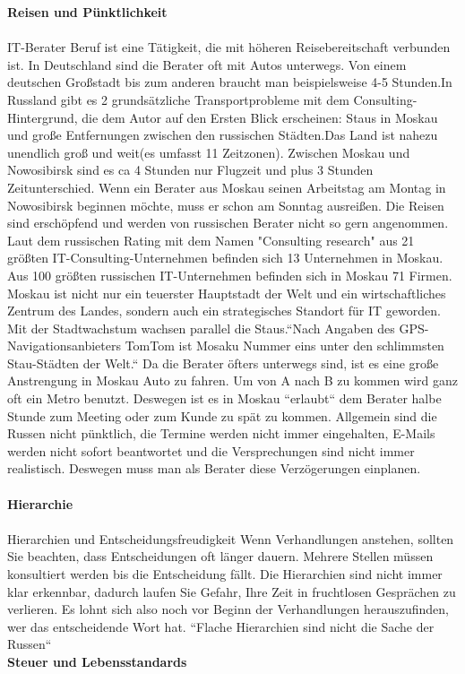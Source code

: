 	 \textbf{Reisen und Pünktlichkeit}\\
	 \\
	 IT-Berater Beruf ist eine Tätigkeit, die mit höheren Reisebereitschaft verbunden ist. In Deutschland sind die Berater oft mit Autos unterwegs. Von einem deutschen Großstadt bis zum anderen braucht man beispielsweise 4-5 Stunden.In Russland gibt es 2 grundsätzliche Transportprobleme mit dem Consulting-Hintergrund, die dem Autor auf den Ersten Blick erscheinen: Staus in Moskau und große Entfernungen zwischen den russischen Städten.Das Land ist nahezu unendlich groß und weit(es umfasst 11 Zeitzonen).
	 Zwischen Moskau und Nowosibirsk sind es ca 4 Stunden nur Flugzeit und plus 3 Stunden Zeitunterschied. Wenn ein Berater aus Moskau seinen Arbeitstag am Montag in Nowosibirsk beginnen möchte, muss er schon am Sonntag ausreißen. Die Reisen sind erschöpfend und werden von russischen Berater nicht so gern angenommen.\\
	 Laut dem russischen Rating mit dem Namen "Consulting research" aus 21 größten IT-Consulting-Unternehmen befinden sich 13 Unternehmen in Moskau.%
	 Aus 100 größten russischen IT-Unternehmen befinden sich in Moskau 71 Firmen. 
	 Moskau ist nicht nur ein teuerster Hauptstadt der Welt und ein wirtschaftliches Zentrum des Landes, sondern auch ein strategisches Standort für IT geworden.
	 Mit der Stadtwachstum wachsen parallel die Staus.``Nach Angaben des GPS-Navigationsanbieters TomTom ist Mosaku Nummer eins unter den schlimmsten Stau-Städten der Welt.``%
	 Da die Berater öfters unterwegs sind, ist es eine große Anstrengung in Moskau Auto zu fahren. Um von A nach B zu kommen wird ganz oft ein Metro benutzt. 
	 Deswegen ist es in Moskau ``erlaubt`` dem Berater halbe Stunde zum Meeting oder zum  Kunde zu spät zu kommen. Allgemein sind die Russen nicht pünktlich, die Termine werden nicht immer eingehalten, E-Mails werden nicht sofort beantwortet und die Versprechungen sind nicht immer realistisch. Deswegen muss man als Berater diese Verzögerungen einplanen.%
	  \\ 
	  \\
	 	 \textbf{Hierarchie}\\
	 	 \\
	 Hierarchien und Entscheidungsfreudigkeit
	 Wenn Verhandlungen anstehen, sollten Sie beachten, dass Entscheidungen oft länger dauern. Mehrere Stellen müssen konsultiert werden bis die Entscheidung fällt. Die Hierarchien sind nicht immer klar erkennbar, dadurch laufen Sie Gefahr, Ihre Zeit in fruchtlosen Gesprächen zu verlieren. Es lohnt sich also noch vor Beginn der Verhandlungen herauszufinden, wer das entscheidende Wort hat.
	 ``Flache Hierarchien sind nicht die Sache der Russen`` %
	 \\
	 		\textbf{Steuer und Lebensstandards}\\
	 		\\
